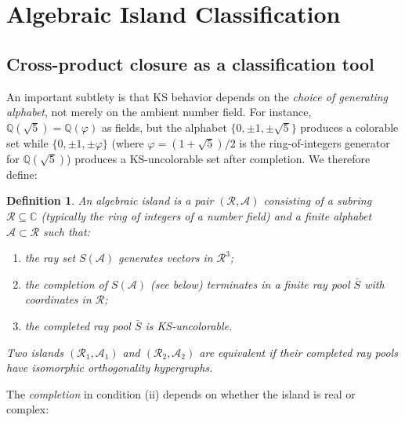 \documentclass[12pt,a4paper]{article}
\newtheorem{definition}[theorem]{Definition}
\newcommand{\C}{\mathbb{C}}
\newcommand{\Q}{\mathbb{Q}}
\begin{document}
\section{Algebraic Island Classification}\label{sec:islands}

\subsection{Cross-product closure as a classification tool}\label{sec:closure}

An important subtlety is that KS behavior depends on the \emph{choice of generating alphabet}, not merely on the ambient number field. For instance, $\Q(\sqrt{5}) = \Q(\varphi)$ as fields, but the alphabet $\{0, \pm 1, \pm\sqrt{5}\}$ produces a colorable set while $\{0, \pm 1, \pm\varphi\}$ (where $\varphi = (1+\sqrt{5})/2$ is the ring-of-integers generator for $\Q(\sqrt{5})$) produces a KS-uncolorable set after completion. We therefore define:

\begin{definition}
An \emph{algebraic island} is a pair $(\mathcal{R}, \mathcal{A})$ consisting of a subring $\mathcal{R} \subseteq \C$ (typically the ring of integers of a number field) and a finite alphabet $\mathcal{A} \subset \mathcal{R}$ such that:
\begin{enumerate}[label=(\roman*)]
    \item the ray set $S(\mathcal{A})$ generates vectors in $\mathcal{R}^3$;
    \item the completion of $S(\mathcal{A})$ (see below) terminates in a \emph{finite} ray pool $\bar{S}$ with coordinates in $\mathcal{R}$;
    \item the completed ray pool $\bar{S}$ is KS-uncolorable.
\end{enumerate}
Two islands $(\mathcal{R}_1, \mathcal{A}_1)$ and $(\mathcal{R}_2, \mathcal{A}_2)$ are \emph{equivalent} if their completed ray pools have isomorphic orthogonality hypergraphs.
\end{definition}

The \emph{completion} in condition (ii) depends on whether the island is real or complex:
\end{document}
